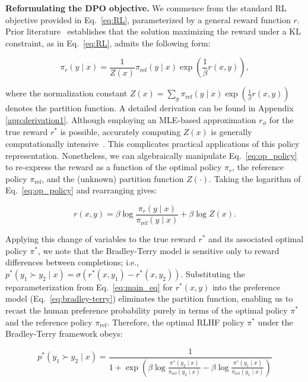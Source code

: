 \textbf{Reformulating the DPO objective.} We commence from the standard RL objective provided in Eq.~\ref{eq:RL}, parameterized by a general reward function $r$. Prior literature~\citep{peters2007reinforcement, peng2019advantage, korbak2022reinforcement, go2023aligning} establishes that the solution maximizing the reward under a KL constraint, as in Eq.~\ref{eq:RL}, admits the following form:

\begin{equation}\label{eq:op_policy}
    \pi_r(y\mid x) = \frac{1}{Z(x)}\pi_\text{ref}(y\mid x)\exp\left(\frac{1}{\beta}r(x, y)\right),
\end{equation}

where the normalization constant $Z(x) =\sum_{y}\pi_\text{ref}(y\mid x)\exp\left(\frac{1}{\beta}r(x, y)\right)$ denotes the partition function. A detailed derivation can be found in Appendix \ref{app:derivation1}. Although employing an MLE-based approximation $r_{\phi}$ for the true reward $r^*$ is possible, accurately computing $Z(x)$ is generally computationally intensive~\citep{korbak2022reinforcement, go2023aligning}. This complicates practical applications of this policy representation. Nonetheless, we can algebraically manipulate Eq.~\ref{eq:op_policy} to re-express the reward as a function of the optimal policy $\pi_r$, the reference policy $\pi_\text{ref}$, and the (unknown) partition function $Z(\cdot)$. Taking the logarithm of Eq.~\ref{eq:op_policy} and rearranging gives:

\begin{equation}\label{eq:main_eq}
    r(x,y) =\beta \log \frac{\pi_r(y\mid x)}{\pi_\text{ref}(y\mid x)} + \beta \log Z(x).
\end{equation}

Applying this change of variables to the true reward $r^*$ and its associated optimal policy $\pi^*$, we note that the Bradley-Terry model is sensitive only to reward differences between completions; i.e., ${p^*(y_1 \succ y_2 \mid x) = \sigma(r^*(x, y_1) - r^*(x, y_2))}$. Substituting the reparameterization from Eq.~\ref{eq:main_eq} for $r^*(x,y)$ into the preference model (Eq.~\ref{eq:bradley-terry}) eliminates the partition function, enabling us to recast the human preference probability purely in terms of the optimal policy $\pi^*$ and the reference policy $\pi_\text{ref}$. Therefore, the optimal RLHF policy $\pi^*$ under the Bradley-Terry framework obeys:

\begin{equation}\label{eq:objective}
    p^*(y_1\succ y_2 \mid x)=\frac{1}{1 + \exp\left(\beta \log \frac{\pi^*(y_2\mid x)}{\pi_\text{ref}(y_2\mid x)} - \beta \log \frac{\pi^*(y_1\mid x)}{\pi_\text{ref}(y_1\mid x)}\right)}
\end{equation}

